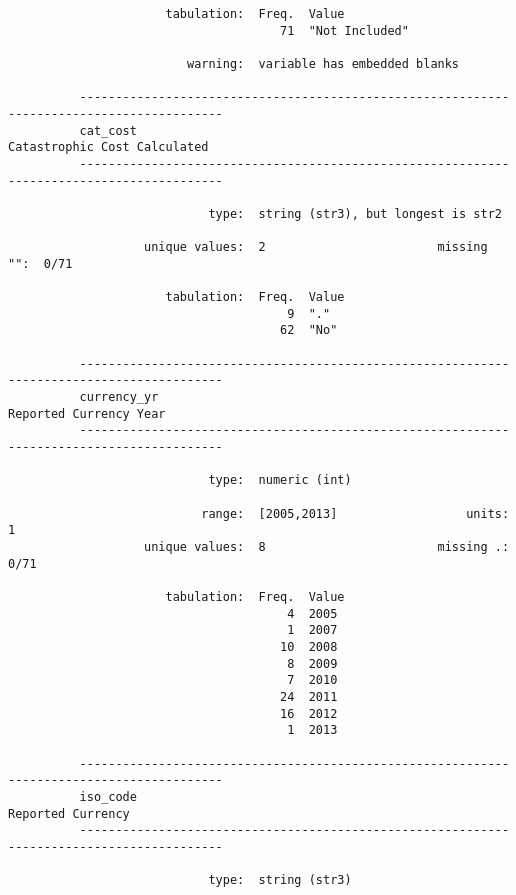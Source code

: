 \documentclass{article}
\begin{document}
\begin{verbatim}
                      tabulation:  Freq.  Value
                                      71  "Not Included"
          
                         warning:  variable has embedded blanks
          
          ------------------------------------------------------------------------------------------
          cat_cost                                                      Catastrophic Cost Calculated
          ------------------------------------------------------------------------------------------
          
                            type:  string (str3), but longest is str2
          
                   unique values:  2                        missing "":  0/71
          
                      tabulation:  Freq.  Value
                                       9  "."
                                      62  "No"
          
          ------------------------------------------------------------------------------------------
          currency_yr                                                         Reported Currency Year
          ------------------------------------------------------------------------------------------
          
                            type:  numeric (int)
          
                           range:  [2005,2013]                  units:  1
                   unique values:  8                        missing .:  0/71
          
                      tabulation:  Freq.  Value
                                       4  2005
                                       1  2007
                                      10  2008
                                       8  2009
                                       7  2010
                                      24  2011
                                      16  2012
                                       1  2013
          
          ------------------------------------------------------------------------------------------
          iso_code                                                                 Reported Currency
          ------------------------------------------------------------------------------------------
          
                            type:  string (str3)
          

\end{verbatim}
\end{document}
